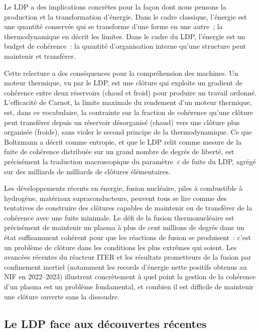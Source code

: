 \documentclass[12pt, a4paper, openright]{book}
\begin{document}
Le LDP a des implications concrètes pour la façon dont nous pensons la production et la transformation d'énergie. Dans le cadre classique, l'énergie est une quantité conservée qui se transforme d'une forme en une autre~; la thermodynamique en décrit les limites. Dans le cadre du LDP, l'énergie est un budget de cohérence~: la quantité d'organisation interne qu'une structure peut maintenir et transférer.

\medskip

Cette relecture a des conséquences pour la compréhension des machines. Un moteur thermique, vu par le LDP, est une clôture qui exploite un gradient de cohérence entre deux réservoirs (chaud et froid) pour produire un travail ordonné. L'efficacité de Carnot, la limite maximale du rendement d'un moteur thermique, est, dans ce vocabulaire, la contrainte sur la fraction de cohérence qu'une clôture peut transférer depuis un réservoir désorganisé (chaud) vers une clôture plus organisée (froide), sans violer le second principe de la thermodynamique. Ce que Boltzmann a décrit comme entropie, et que le LDP relit comme mesure de la fuite de cohérence distribuée sur un grand nombre de degrés de liberté, est précisément la traduction macroscopique du paramètre~$\varepsilon$ de fuite du LDP, agrégé sur des milliards de milliards de clôtures élémentaires.

\medskip

Les développements récents en énergie, fusion nucléaire, piles à combustible à hydrogène, matériaux supraconducteurs, peuvent tous se lire comme des tentatives de construire des clôtures capables de maintenir ou de transférer de la cohérence avec une fuite minimale. Le défi de la fusion thermonucléaire est précisément de maintenir un plasma à plus de cent millions de degrés dans un état suffisamment cohérent pour que les réactions de fusion se produisent~: c'est un problème de clôture dans les conditions les plus extrêmes qui soient. Les avancées récentes du réacteur ITER et les résultats prometteurs de la fusion par confinement inertiel (notamment les records d'énergie nette positifs obtenus au NIF en 2022--2023) illustrent concrètement à quel point la gestion de la cohérence d'un plasma est un problème fondamental, et combien il est difficile de maintenir une clôture ouverte sans la dissoudre.

\subsection*{Le LDP face aux découvertes récentes}
\end{document}
